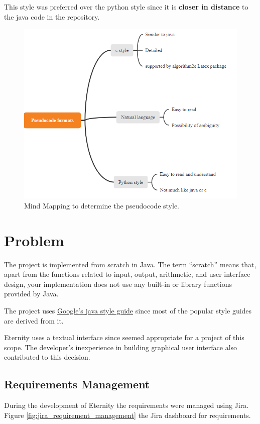 \documentclass[11pt,a4paper]{report}
\theoremstyle{definition}
\theoremstyle{remark}
\begin{document}
            This style was preferred over the python style since it is \textbf{closer in distance} to the java code in the repository.
            
            \begin{figure}[htbp]
                \centering
                \includegraphics[width=0.75\linewidth]{pseudocode_mindmap.PNG}
                \caption{Mind Mapping to determine the pseudocode style.}
                \label{fig:pseudocode_mindmap}
            \end{figure}
        
    
    \chapter{Problem}
        The project is implemented from scratch in Java. The term “scratch” means that, apart from the functions related to input, output, arithmetic, and user interface design, your implementation does not use any built-in or library functions provided by Java.
        
        The project uses \href{https://google.github.io/styleguide/javaguide.html}{Google's java style guide} since most of the popular style guides are derived from it.
        
        Eternity uses a textual interface since seemed appropriate for a project of this scope. The developer's inexperience in building graphical user interface also contributed to this decision.
        
        \section{Requirements Management}
        During the development of Eternity the requirements were managed using Jira. Figure \ref{fig:jira_requirement_management} the Jira dashboard for requirements.
        
\end{document}
